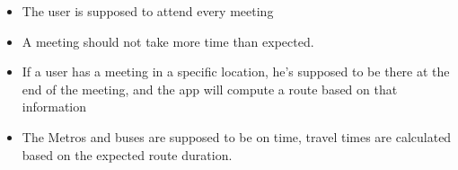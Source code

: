 \begin{itemize}
\item The user is supposed to attend every meeting

\item A meeting should not take more time than expected.

\item If a user has a meeting in a specific location, he's supposed to be there at the end of the meeting, and the app will compute a route based on that information

\item The Metros and buses are supposed to be on time, travel times are calculated based on the expected route duration.
\end{itemize}